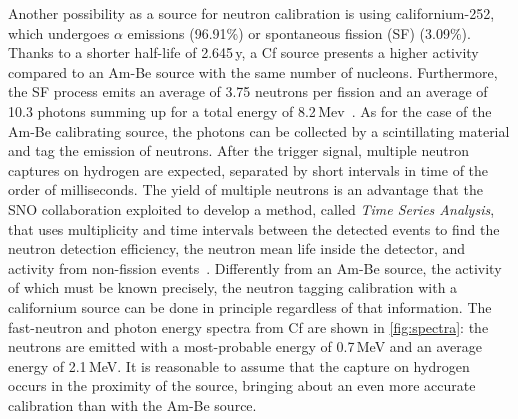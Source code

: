 Another possibility as a source for neutron calibration is using californium-252, which %
undergoes $\alpha$ emissions (96.91\%) or spontaneous fission (SF) (3.09\%).
Thanks to a shorter half-life of 2.645\,y, a Cf source presents a higher activity compared to an Am-Be source %
with the same number of nucleons.
Furthermore, the SF process emits an average of 3.75 neutrons per fission and an average of 10.3 photons %
summing up for a total energy of 8.2\,Mev~\cite{PhysRev.104.699}.
As for the case of the Am-Be calibrating source, the photons can be collected by a scintillating material %
and tag the emission of neutrons.
After the trigger signal, multiple neutron captures on hydrogen are expected, separated by short intervals in time %
of the order of milliseconds.
The yield of multiple neutrons is an advantage that the SNO collaboration exploited to develop a method, %
called \emph{Time Series Analysis}, that uses multiplicity and time intervals between the detected events %
to find the neutron detection efficiency, the neutron mean life inside the detector, %
and activity from non-fission events~\cite{Labranche:2004sya}.
Differently from an Am-Be source, the activity of which must be known precisely, the neutron tagging calibration %
with a californium source can be done in principle regardless of that information.
The fast-neutron and photon energy spectra from Cf are shown in \ref{fig:spectra}: %
the neutrons are emitted with a most-probable energy of 0.7\,MeV and an average energy of 2.1\,MeV.
It is reasonable to assume that the capture on hydrogen occurs in the proximity of the source, %
bringing about an even more accurate calibration than with the Am-Be source.


